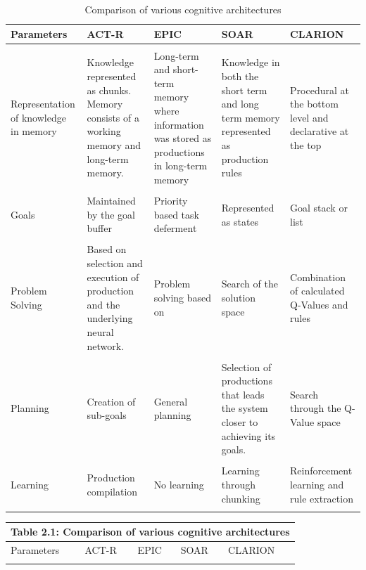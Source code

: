 \begin{lscapenum}  
  \begin{table}
    \centering
    \label{tab:architecture-comparison}
    \caption{Comparison of various cognitive architectures}

    \begin{tabular}{p{2.5cm}p{3.7cm}p{3.7cm}p{3.7cm}p{3.7cm}}
      \hline
      Parameters & ACT-R & EPIC & SOAR & CLARION \\
      \hline
      & & & &\\
      Representation of knowledge in memory & Knowledge represented as chunks. Memory consists of a
      working memory and long-term memory.& Long-term and short-term
      memory where information was stored as productions in long-term
      memory & Knowledge in both the short term and long term memory
      represented as production rules& Procedural at the bottom level and
      declarative at the top  \\
      & & & &\\
      Goals  & Maintained by the goal buffer & Priority based task
      deferment~\cite{Pew:1998aa}& Represented as states & Goal stack or list \\
      & & & &\\
      Problem Solving  & Based on selection and execution of production
      and the underlying neural network.& Problem solving based on &Search
      of the solution space& Combination of calculated Q-Values and rules\\
      & & & &\\
      Planning  & Creation of sub-goals&General planning & Selection of
      productions that leads the system closer to achieving its
      goals. &Search through the Q-Value space \\
      & & & &\\
      Learning   & Production compilation&No learning & Learning through
      chunking & Reinforcement learning and rule extraction \\
      & & & &\\
      
    \end{tabular}
  \end{table}

\pagebreak

  \begin{table}
    \centering

    \begin{tabular}{p{2.5cm}p{3.7cm}p{3.7cm}p{3.7cm}p{3.7cm}}
      \multicolumn{5}{c}{Table 2.1: Comparison of various cognitive architectures}\\
      \hline
      Parameters & ACT-R & EPIC & SOAR & CLARION \\
      \hline
      & & & &\\
      

\end{tabular}
\end{table}
\end{lscapenum}
